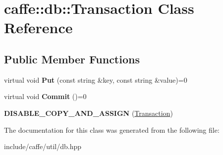 \hypertarget{classcaffe_1_1db_1_1Transaction}{}\section{caffe\+:\+:db\+:\+:Transaction Class Reference}
\label{classcaffe_1_1db_1_1Transaction}
\subsection*{Public Member Functions}
\begin{DoxyCompactItemize}
\item 
virtual void {\bfseries Put} (const string \&key, const string \&value)=0\hypertarget{classcaffe_1_1db_1_1Transaction_a1aa8960bfd0c4eefb348b1d03d8413e6}{}\label{classcaffe_1_1db_1_1Transaction_a1aa8960bfd0c4eefb348b1d03d8413e6}

\item 
virtual void {\bfseries Commit} ()=0\hypertarget{classcaffe_1_1db_1_1Transaction_a7671332a70ee234f85a7044a0d20d579}{}\label{classcaffe_1_1db_1_1Transaction_a7671332a70ee234f85a7044a0d20d579}

\item 
{\bfseries D\+I\+S\+A\+B\+L\+E\+\_\+\+C\+O\+P\+Y\+\_\+\+A\+N\+D\+\_\+\+A\+S\+S\+I\+GN} (\hyperlink{classcaffe_1_1db_1_1Transaction}{Transaction})\hypertarget{classcaffe_1_1db_1_1Transaction_a0cb78598bb826f9e4679628ad8aa8420}{}\label{classcaffe_1_1db_1_1Transaction_a0cb78598bb826f9e4679628ad8aa8420}

\end{DoxyCompactItemize}


The documentation for this class was generated from the following file\+:\begin{DoxyCompactItemize}
\item 
include/caffe/util/db.\+hpp\end{DoxyCompactItemize}
